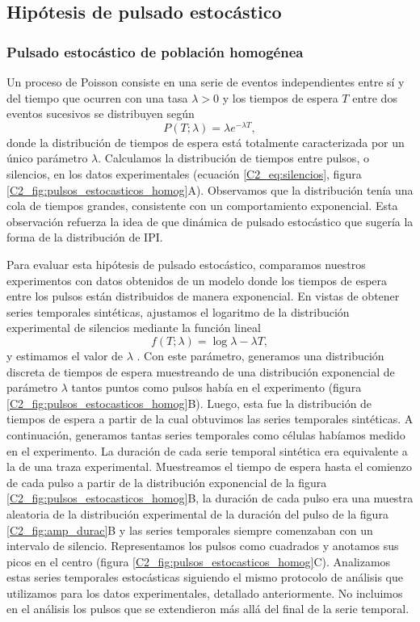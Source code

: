 \documentclass[./main.tex]{subfiles}
\begin{document}
\subsection{Hipótesis de pulsado estocástico}
\subsubsection*{Pulsado estocástico de población homogénea}

Un proceso de Poisson consiste en una serie de eventos independientes entre sí y del tiempo que ocurren con una tasa $\lambda > 0$ y los tiempos de espera $T$ entre dos eventos sucesivos se distribuyen según \cite{TimeSeries1972,Levine2013}
\begin{equation}
    P(T;\lambda) = \lambda e^{-\lambda T},
\end{equation}
donde la distribución de tiempos de espera está totalmente caracterizada por un único parámetro $\lambda$. Calculamos la distribución de tiempos entre pulsos, o silencios, en los datos experimentales (ecuación \ref{C2_eq:silencios}, figura \ref{C2_fig:pulsos_estocasticos_homog}A). Observamos que la distribución tenía una cola de tiempos grandes, consistente con un comportamiento exponencial. Esta observación refuerza la idea de que dinámica de pulsado estocástico que sugería la forma de la distribución de IPI. 

Para evaluar esta hipótesis de pulsado estocástico, comparamos nuestros experimentos con datos obtenidos de un modelo donde los tiempos de espera entre los pulsos están distribuidos de manera exponencial. En vistas de obtener series temporales sintéticas, ajustamos el logaritmo de la distribución experimental de silencios mediante la función lineal 
\begin{equation}
    f(T;\lambda) = \log{\lambda} - \lambda T,
    \label{C2_eq:ajuste_homogeneo}
\end{equation}
y estimamos el valor de $\lambda$ \cite{Harris2020}. Con este parámetro, generamos una distribución discreta de tiempos de espera muestreando de una distribución exponencial de parámetro $\lambda$ tantos puntos como pulsos había en el experimento (figura \ref{C2_fig:pulsos_estocasticos_homog}B). Luego, esta fue la distribución de tiempos de espera a partir de la cual obtuvimos las series temporales sintéticas. A continuación, generamos tantas series temporales como células habíamos medido en el experimento. La duración de cada serie temporal sintética era equivalente a la de una traza experimental. Muestreamos el tiempo de espera hasta el comienzo de cada pulso a partir de la distribución exponencial de la figura \ref{C2_fig:pulsos_estocasticos_homog}B, la duración de cada pulso era una muestra aleatoria de la distribución experimental de la duración del pulso de la figura \ref{C2_fig:amp_durac}B y las series temporales siempre comenzaban con un intervalo de silencio. Representamos los pulsos como cuadrados y anotamos sus picos en el centro (figura \ref{C2_fig:pulsos_estocasticos_homog}C). Analizamos estas series temporales estocásticas siguiendo el mismo protocolo de análisis que utilizamos para los datos experimentales, detallado anteriormente. No incluimos en el análisis los pulsos que se extendieron más allá del final de la serie temporal. 
\end{document}
